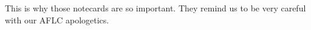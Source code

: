 
This is why those notecards are so important. They remind us to be very careful with our AFLC apologetics. 










